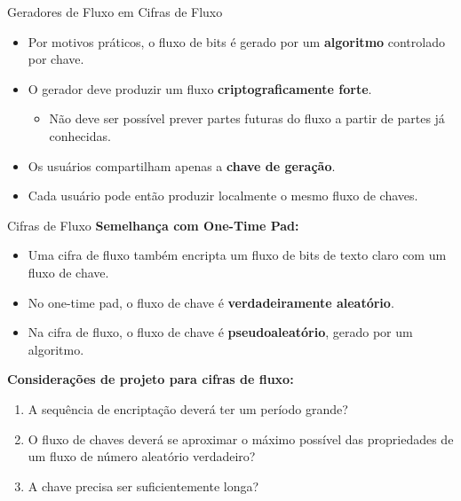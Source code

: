 \begin{frame}{Geradores de Fluxo em Cifras de Fluxo}
    \begin{itemize}
        \item Por motivos práticos, o fluxo de bits é gerado por um \textbf{algoritmo} controlado por chave.
        \item O gerador deve produzir um fluxo \textbf{criptograficamente forte}.
              \begin{itemize}
                  \item Não deve ser possível prever partes futuras do fluxo a partir de partes já conhecidas.
              \end{itemize}
        \item Os usuários compartilham apenas a \textbf{chave de geração}.
        \item Cada usuário pode então produzir localmente o mesmo fluxo de chaves.
    \end{itemize}
\end{frame}

\begin{frame}{Cifras de Fluxo}
    \textbf{Semelhança com One-Time Pad:}
    \begin{itemize}
        \item Uma cifra de fluxo também encripta um fluxo de bits de texto claro com um fluxo de chave.
        \item No one-time pad, o fluxo de chave é \textbf{verdadeiramente aleatório}.
        \item Na cifra de fluxo, o fluxo de chave é \textbf{pseudoaleatório}, gerado por um algoritmo.
    \end{itemize}

    \textbf{Considerações de projeto para cifras de fluxo:}
    \begin{enumerate}
        \item A sequência de encriptação deverá ter um período grande?
        \item O fluxo de chaves deverá se aproximar o máximo possível das propriedades de um fluxo de número
              aleatório verdadeiro?
        \item A  chave precisa ser suficientemente longa?
    \end{enumerate}
\end{frame}

